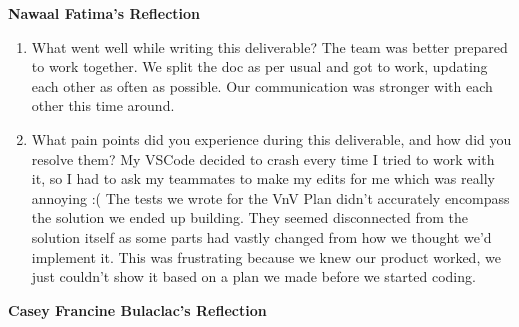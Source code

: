 \documentclass[12pt, titlepage]{article}
\begin{document}
\textbf{Nawaal Fatima's Reflection}
\begin{enumerate}
  \item What went well while writing this deliverable?
    The team was better prepared to work together. We split the doc
    as per usual and got to work, updating each other as often as
    possible. Our communication was stronger with each other this time around.

  \item What pain points did you experience during this deliverable, and how
    did you resolve them?
    My VSCode decided to crash every time I tried to work with it, so
    I had to ask my teammates to make my edits for me which was
    really annoying :(
      The tests we wrote for the VnV Plan didn't accurately encompass
      the solution we ended up building. They seemed disconnected
      from the solution itself as some parts had vastly changed from
      how we thought we'd implement it. This was frustrating because
      we knew our product worked, we just couldn't show it based on a
      plan we made before we started coding.
  \end{enumerate}

  \textbf{Casey Francine Bulaclac's Reflection}
\end{document}
